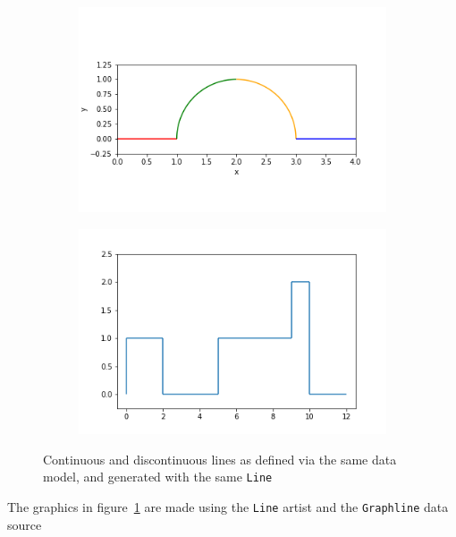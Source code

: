 \documentclass[../main.tex]{subfiles}
\begin{document}
\begin{figure}[H]
    \begin{subfigure}{0.5\textwidth}
        \includegraphics[width=\textwidth]{figures/code/linec_1.png}
    \end{subfigure}
    \begin{subfigure}{0.5\textwidth}
        \includegraphics[width=\textwidth]{figures/code/lined_1.png}
    \end{subfigure}
    \caption{Continuous and discontinuous lines as defined via the same data model, and generated with the same \vartisteq \texttt{Line}}
    \label{fig:circle_step}
\end{figure}

The graphics in figure~\ref{fig:circle_step} are made using the \texttt{Line} artist and the \texttt{Graphline} data source
\end{document}

